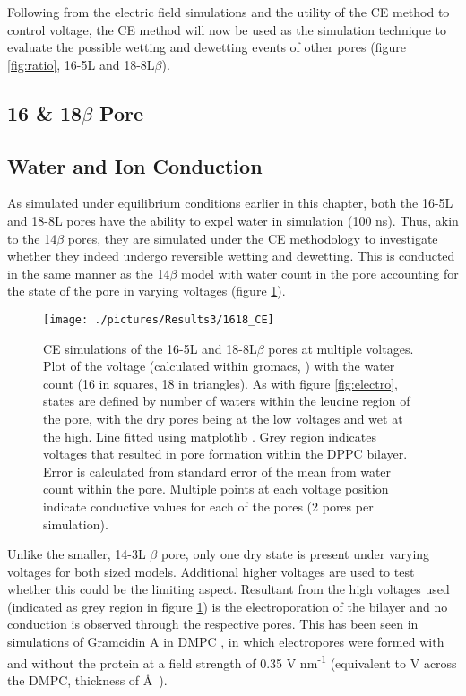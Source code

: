 Following from the electric field simulations and the utility of the CE method to control voltage, the CE method will now be used as the simulation technique to evaluate the possible wetting and dewetting events of other pores (figure \ref{fig:ratio}, 16-5L and 18-8L$\beta$).

\subsection{16 \& 18$\beta$ Pore}
\subsection*{Water and Ion Conduction}

As simulated under equilibrium conditions earlier in this chapter, both the 16-5L and 18-8L pores have the ability to expel water in simulation (100 ns). Thus, akin to the 14$\beta$ pores, they are simulated under the CE methodology to investigate whether they indeed undergo reversible wetting and dewetting. This is conducted in the same manner as the 14$\beta$ model with water count in the pore accounting for the state of the pore in varying voltages (figure \ref{fig:1618_CE}). 

\begin{figure}[H]
\begin{center}
\texttt{[image: ./pictures/Results3/1618\_CE]}
\caption[CE simulations of the 16-5L and 18-8L$\beta$ pores at multiple voltages.] {CE simulations of the 16-5L and 18-8L$\beta$ pores at multiple voltages. Plot of the voltage (calculated within gromacs, \cite{VanderSpoel2013}) with the water count (16 in squares, 18 in triangles). As with figure \ref{fig:electro}, states are defined by number of waters within the leucine region of the pore, with the dry pores being at the low voltages and wet at the high. Line fitted using matplotlib \cite{Hunter2007}. Grey region indicates voltages that resulted in pore formation within the DPPC bilayer. Error is calculated from standard error of the mean from water count within the pore. Multiple points at each voltage position indicate conductive values for each of the pores (2 pores per simulation).}
\label{fig:1618_CE}
\end{center}
\end{figure}


Unlike the smaller, 14-3L $\beta$ pore, only one dry state is present under varying voltages for both sized models. Additional higher voltages are used to test whether this could be the limiting aspect. Resultant from the high voltages used (indicated as grey region in figure \ref{fig:1618_CE}) is the electroporation of the bilayer and no conduction is observed through the respective pores. This has been seen in simulations of Gramcidin A in DMPC \cite{Siu2007}, in which electropores were formed with and without the protein at a field strength of 0.35 V nm\textsuperscript{-1} (equivalent to  V across the DMPC,  thickness of  \AA\ \cite{Tristram-Nagle2002}).

